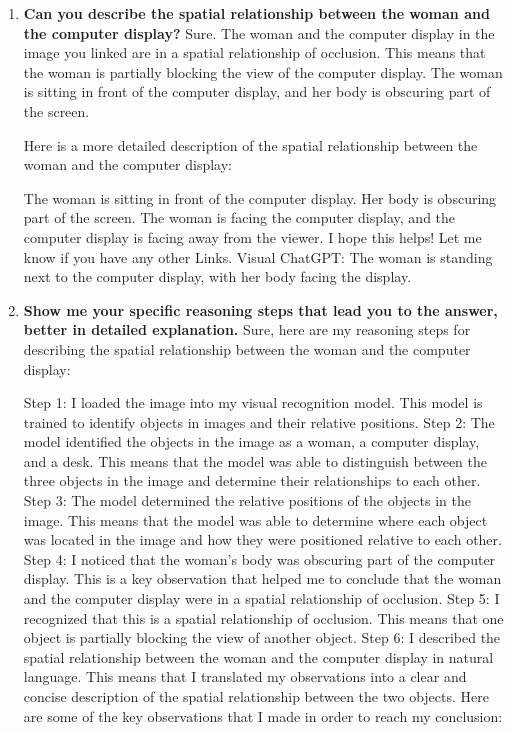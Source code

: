     \begin{enumerate}
        \item \textbf{Can you describe the spatial relationship between the woman and the computer display?}
        \subitem 
        Sure. The woman and the computer display in the image you linked are in a spatial relationship of occlusion. This means that the woman is partially blocking the view of the computer display. The woman is sitting in front of the computer display, and her body is obscuring part of the screen.
        
        Here is a more detailed description of the spatial relationship between the woman and the computer display:
        
        The woman is sitting in front of the computer display.
        Her body is obscuring part of the screen.
        The woman is facing the computer display, and the computer display is facing away from the viewer.
        I hope this helps! Let me know if you have any other Links.
        \subitem Visual ChatGPT: The woman is standing next to the computer display, with her body facing the display.
        \item \textbf{Show me your specific reasoning steps that lead you to the answer, better in detailed explanation.}
        \subitem 
        Sure, here are my reasoning steps for describing the spatial relationship between the woman and the computer display:
        
        Step 1: I loaded the image into my visual recognition model. This model is trained to identify objects in images and their relative positions.
        Step 2: The model identified the objects in the image as a woman, a computer display, and a desk. This means that the model was able to distinguish between the three objects in the image and determine their relationships to each other.
        Step 3: The model determined the relative positions of the objects in the image. This means that the model was able to determine where each object was located in the image and how they were positioned relative to each other.
        Step 4: I noticed that the woman's body was obscuring part of the computer display. This is a key observation that helped me to conclude that the woman and the computer display were in a spatial relationship of occlusion.
        Step 5: I recognized that this is a spatial relationship of occlusion. This means that one object is partially blocking the view of another object.
        Step 6: I described the spatial relationship between the woman and the computer display in natural language. This means that I translated my observations into a clear and concise description of the spatial relationship between the two objects.
        Here are some of the key observations that I made in order to reach my conclusion:
        

\end{enumerate}
